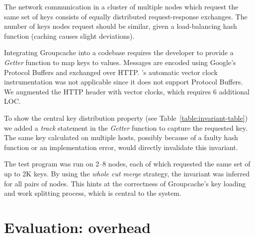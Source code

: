 The network communication in a cluster of multiple nodes which request
the same set of keys consists of equally distributed request-response
exchanges. The number of keys nodes request should be similar, given a
load-balancing hash function (caching causes slight deviations).

Integrating Groupcache into a codebase requires the developer to
provide a \emph{Getter} function to map keys to values. Messages are
encoded using Google's Protocol Buffers and exchanged over
HTTP. \dinv's automatic vector clock instrumentation was not
applicable since it does not support Protocol Buffers. We augmented
the HTTP header with vector clocks, which requires 6 additional LOC.

To show the central key distribution property (see
Table~\ref{table:invariant-table}) we added a \emph{track} statement
in the \emph{Getter} function to capture the requested key. The same
key calculated on multiple hosts, possibly because of a faulty hash
function or an implementation error, would directly invalidate this
invariant.
 
 
The test program was run on 2--8 nodes, each of which requested the
same set of up to 2K keys. By using the \emph{whole cut merge}
strategy, the invariant was inferred for all pairs of nodes. This
hints at the correctness of Groupcache's key loading and work
splitting process, which is central to the system.





\section{Evaluation: \dinv overhead}
\label{sec:eval-perf}

